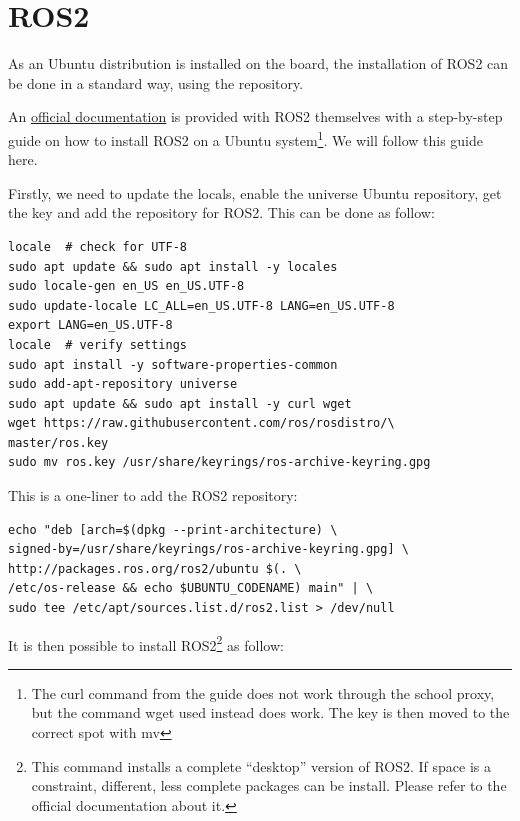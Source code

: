 \documentclass[10pt]{article}
\begin{document}
\pagebreak
\section{ROS2}
\label{sec:ros2}
As an Ubuntu distribution is installed on the board, the installation of ROS2
can be done in a standard way, using the repository.

An \href{https://docs.ros.org/en/humble/Installation/Ubuntu-Install-Debians.html}{official documentation}
is provided with ROS2 themselves with a step-by-step guide on how to install
ROS2 on a Ubuntu system\footnote{The curl command from the guide does not work through the school proxy,
  but the command wget used instead does work. The key is then moved to the correct spot with mv}.
We will follow this guide here.

Firstly, we need to update the locals, enable the universe Ubuntu repository,
get the key and add the repository for ROS2. This can be done as follow:

\begin{tcolorbox}
\begin{verbatim}
locale  # check for UTF-8
sudo apt update && sudo apt install -y locales
sudo locale-gen en_US en_US.UTF-8
sudo update-locale LC_ALL=en_US.UTF-8 LANG=en_US.UTF-8
export LANG=en_US.UTF-8
locale  # verify settings
sudo apt install -y software-properties-common
sudo add-apt-repository universe
sudo apt update && sudo apt install -y curl wget
wget https://raw.githubusercontent.com/ros/rosdistro/\
master/ros.key
sudo mv ros.key /usr/share/keyrings/ros-archive-keyring.gpg
\end{verbatim}
\end{tcolorbox}


This is a one-liner to add the ROS2 repository:

\begin{tcolorbox}
\begin{verbatim}
echo "deb [arch=$(dpkg --print-architecture) \
signed-by=/usr/share/keyrings/ros-archive-keyring.gpg] \
http://packages.ros.org/ros2/ubuntu $(. \
/etc/os-release && echo $UBUNTU_CODENAME) main" | \
sudo tee /etc/apt/sources.list.d/ros2.list > /dev/null
\end{verbatim}
\end{tcolorbox}

It is then possible to install ROS2\footnote{This command installs a complete ``desktop'' version of ROS2. If space is a constraint, different, less complete packages can be install. Please refer to the official documentation about it.} as follow:
\end{document}
